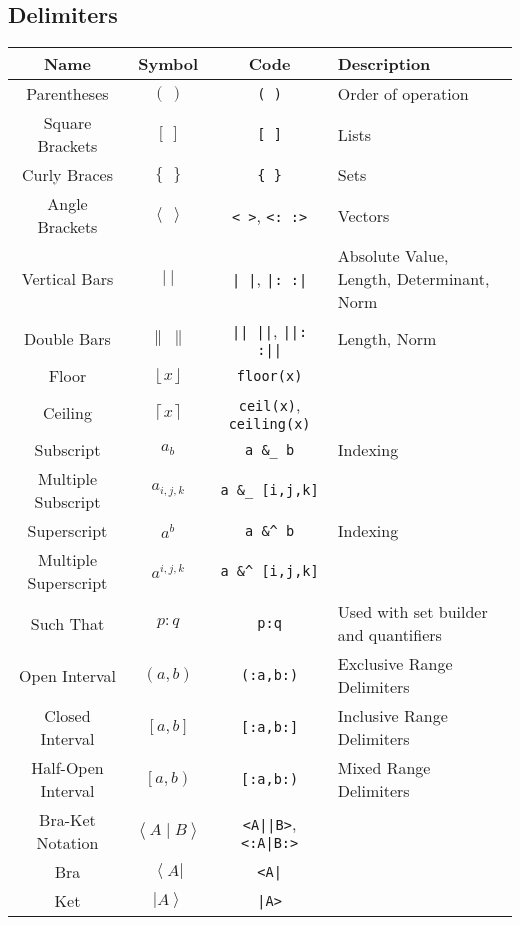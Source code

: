 \documentclass{article}
\begin{document}
  \subsection{Delimiters} %
  \label{sub:delimiters}
  \begin{table}[!h]
    \centering
    \begin{tabular}{|c|c|c|l|}
      \hline
      \textbf{Name} & \textbf{Symbol} & \textbf{Code} & \textbf{Description} \\
      \hline\hline
      Parentheses & \( \left( \ \right) \) & \texttt{( )} & Order of operation \\
      Square Brackets & \( \left[ \ \right] \) & \texttt{[ ]} & Lists \\
      Curly Braces & \( \left\{ \ \right\} \) & \texttt{\{ \}} & Sets \\
      Angle Brackets & \( \left\langle \ \right\rangle \) & \texttt{< >}, \texttt{<: :>} & Vectors \\
      Vertical Bars & \( \left| \ \right| \) & \texttt{| |}, \texttt{|: :|} & Absolute Value, Length, Determinant, Norm \\
      Double Bars & \( \left\| \ \right\| \) & \texttt{|| ||}, \texttt{||: :||} & Length, Norm \\
      Floor & \( \left\lfloor x \right\rfloor \) & \texttt{floor(x)} & \\
      Ceiling & \( \left\lceil x \right\rceil \) & \texttt{ceil(x)}, \texttt{ceiling(x)} & \\
      \hline
      Subscript & \( a_b \) & \texttt{a \&\_ b} & Indexing \\
      Multiple Subscript & \( a_{i,j,k} \) & \texttt{a \&\_ [i,j,k]} & \\
      Superscript & \( a^b \) & \texttt{a \&\^{} b} & Indexing \\
      Multiple Superscript & \( a^{i,j,k} \) & \texttt{a \&\^{} [i,j,k]} & \\
      Such That & \( p : q \) & \texttt{p:q} & Used with set builder and quantifiers \\
      \hline
      Open Interval & \( \left( a,b \right) \) & \texttt{(:a,b:)} & Exclusive Range Delimiters \\
      Closed Interval & \( \left[ a,b \right] \) & \texttt{[:a,b:]} & Inclusive Range Delimiters \\
      Half-Open Interval & \( \left[ a,b \right) \) & \texttt{[:a,b:)} & Mixed Range Delimiters \\
      \hline
      Bra-Ket Notation & \( \left\langle A \mid B \right\rangle \) & \texttt{<A||B>}, \texttt{<:A|B:>} & \\
      Bra & \( \left\langle A \right| \) & \texttt{<A|} & \\
      Ket & \( \left| A \right\rangle \) & \texttt{|A>} & \\
      \hline
    \end{tabular}
  \end{table}
\end{document}
